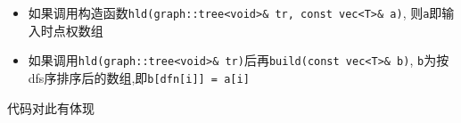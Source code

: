 \begin{itemize}
    \item 如果调用构造函数\verb|hld(graph::tree<void>& tr, const vec<T>& a)|, 则\verb|a|即输入时点权数组
    \item 如果调用\verb|hld(graph::tree<void>& tr)|后再\verb|build(const vec<T>& b)|, \verb|b|为按dfs序排序后的数组,即\verb|b[dfn[i]] = a[i]|
\end{itemize}

代码对此有体现